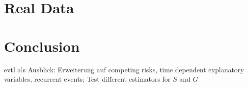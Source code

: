 \documentclass[12pt, a4paper]{article}
\theoremstyle{definition}
\theoremstyle{plain}
\numberwithin{equation}{section}
\numberwithin{figure}{section}
\numberwithin{table}{section}
\begin{document}
	
	\newpage
	\section{Real Data}
	\newpage
	\section{Conclusion}
	
	evtl als Ausblick: Erweiterung auf competing risks, time dependent explanatory variables, recurrent events; Test different estimators for $S$ and $G$
	
	\newpage
	
	\thispagestyle{empty}
	
	
	
	\newpage
	
\end{document}
